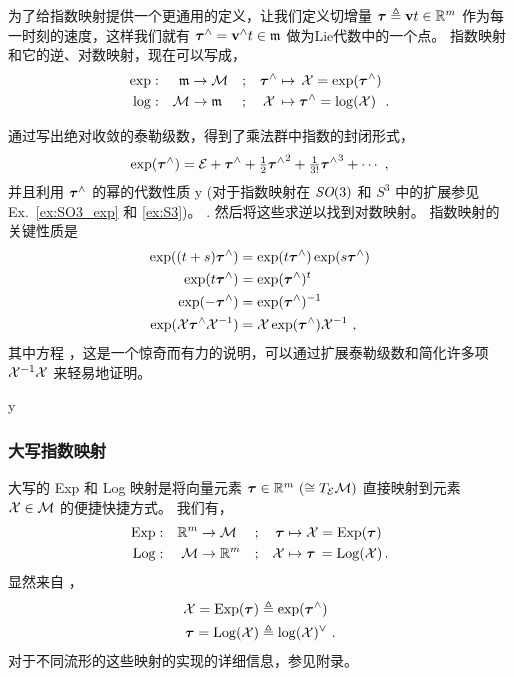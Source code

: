 为了给指数映射提供一个更通用的定义，让我们定义切增量 ${\bm \tau}\triangleq{\bf v} t\in{\mathbb R}^m$ 作为每一时刻的速度，这样我们就有 ${\bm \tau}^\wedge={\bf v}^\wedge t\in\frak{m}$ 做为Lie代数中的一个点。
指数映射和它的逆、对数映射，现在可以写成，
%
\begin{align}
\exp &:& \frak{m} & \to\mathcal{M}          
  &&; & {\bm \tau}^\wedge &\mapsto \,\mathcal{X} = \exp({\bm \tau}^\wedge) 
  \\
\log &:&          \mathcal{M} & \to\frak{m} 
  &&; & \mathcal{X}\,       &\mapsto {\bm \tau}^\wedge = \log(\mathcal{X}) ~
~. 
\end{align}


通过写出绝对收敛的泰勒级数，得到了乘法群中指数的封闭形式，
%
\begin{align}
\exp({\bm \tau}^\wedge)=\mathcal{E}+{\bm \tau}^\wedge+\tfrac12{{\bm \tau}^\wedge}^2+\tfrac1{3!}{{\bm \tau}^\wedge}^3+\cdots
~,
\end{align}
%
并且利用 ${\bm \tau}^\wedge$ 的幂的代数性质%
\if \examples y (对于指数映射在 $\textit{SO}(3)$ 和 $S^3$ 中的扩展参见 Ex.~\ref{ex:SO3_exp} 和 \ref{ex:S3})。 \else. \fi
然后将这些求逆以找到对数映射。
%
指数映射的关键性质是 
%
\begin{align}
\exp((t+s){\bm \tau}^\wedge) 
  &= \exp(t{\bm \tau}^\wedge)\exp(s{\bm \tau}^\wedge) \label{equ:prop_exp_ts}
  \\
\exp(t{\bm \tau}^\wedge) 
  &= \exp({\bm \tau}^\wedge)^t \label{equ:prop_exp_t}
  \\
\exp(-{\bm \tau}^\wedge) 
  &= \exp({\bm \tau}^\wedge)^{-1} \label{equ:prop_exp_inv}
  \\
\exp(\mathcal{X}{\bm \tau}^\wedge\mathcal{X}^{-1}) 
  &= \mathcal{X}\exp({\bm \tau}^\wedge)\mathcal{X}^{-1} ~, \label{equ:prop_exp}
\end{align} 
%
其中方程 ，这是一个惊奇而有力的说明，可以通过扩展泰勒级数和简化许多项 $\mathcal{X}^{-1}\mathcal{X}$ 来轻易地证明。

\if\examples y

\fi



\subsubsection[The capitalized Exp map]{大写指数映射}


大写的 Exp 和 Log 映射是将向量元素 ${\bm \tau}\in{\mathbb R}^m~(\cong T_{\mathcal{E}}{\mathcal{M}})$ 直接映射到元素 $\mathcal{X}\in\mathcal{M}$ 的便捷快捷方式。
% 
我们有，
%
\begin{align}
\operatorname*{Exp} &: &{\mathbb R}^m &\to\mathcal{M} &&;&
\,{\bm \tau} &\mapsto \mathcal{X} = \operatorname*{Exp}({\bm \tau})\\
\operatorname*{Log}    &: & \mathcal{M} &\to{\mathbb R}^m &&;&
  \mathcal{X}  &\mapsto {\bm \tau}\,=\operatorname*{Log}(\mathcal{X}) 
\,. 
\end{align}
%
显然来自 ，
%
\begin{align}
\mathcal{X}    = \operatorname*{Exp}({\bm \tau}) &\triangleq \exp({\bm \tau}^\wedge) \\
{\bm \tau} =\operatorname*{Log}(\mathcal{X})        &\triangleq \log(\mathcal{X})^\vee 
~. 
\end{align}
%
对于不同流形的这些映射的实现的详细信息，参见附录。


